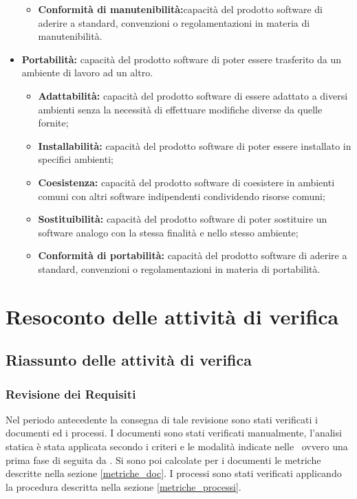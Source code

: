 \documentclass[12pt,a4paper]{article}
\begin{document}
\begin{itemize}
\begin{itemize}
		\item \textbf{Conformità di manutenibilità:}capacità del prodotto software di aderire a standard, convenzioni o regolamentazioni in materia di manutenibilità.
	\end{itemize}
	\item \textbf{Portabilità:} capacità del prodotto software di poter essere trasferito da un ambiente di lavoro ad un altro.
	\begin{itemize}
		\item \textbf{Adattabilità:} capacità del prodotto software di essere adattato a diversi ambienti senza la necessità di effettuare modifiche diverse da quelle fornite;
		\item \textbf{Installabilità: }capacità del prodotto software di poter essere installato in specifici ambienti;
		\item \textbf{Coesistenza: }capacità del prodotto software di coesistere in ambienti comuni con altri software indipendenti condividendo risorse comuni;
		\item \textbf{Sostituibilità:} capacità del prodotto software di poter sostituire un software analogo con la stessa finalità e nello stesso ambiente;
		\item \textbf{ Conformità di portabilità:} capacità del prodotto software di aderire a standard, convenzioni o regolamentazioni in materia di portabilità.
	\end{itemize}
\end{itemize}

\newpage
\appendix
\section{Resoconto delle attività di verifica} \label{Resoconto delle attività di verifica}
\subsection{Riassunto delle attività di verifica} 
\subsubsection{Revisione dei Requisiti}
Nel periodo antecedente la consegna di tale revisione sono stati verificati i documenti ed i processi.
I documenti sono stati verificati manualmente, l'analisi statica è stata applicata secondo i criteri e le modalità indicate nelle \NdP\, ovvero una prima fase di  seguita da .
Si sono poi calcolate per i documenti le metriche descritte nella sezione \ref{metriche_doc}.
I processi sono stati verificati applicando la procedura descritta nella sezione \ref{metriche_processi}.
\end{document}
